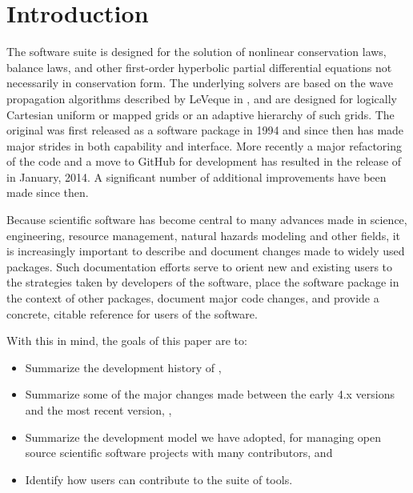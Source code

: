 %
%
%

\section{Introduction}\label{sec:intro}

The \clawpack software suite \cite{clawpack} is designed for the
solution of nonlinear conservation laws, balance laws, and other
first-order hyperbolic partial differential equations not necessarily
in conservation form.  The underlying solvers are based on the wave
propagation algorithms described by LeVeque in \cite{rjl:fvmhp}, and
are designed for logically Cartesian uniform or mapped grids or an
adaptive hierarchy of such grids.  The original \clawpack was first
released as a software package in 1994 and since then has made major
strides in both capability and interface. More recently a major
refactoring of the code and a move to GitHub for development has
resulted in the release of  in January, 2014. A
significant number of additional improvements have been made since
then.

Because scientific software  has become central to many advances made
in science, engineering, resource management, natural hazards modeling
and other fields, it is increasingly important to describe and
document changes made to widely used packages.  Such documentation efforts
serve to orient new and existing users to the  strategies
taken by developers of the software, place the software package in the context
of other packages, document major code changes, and provide a
concrete, citable reference for users of the software.

\newpage %
With this in mind, the goals of this paper are to:

\begin{itemize}
\item Summarize the development history of \clawpack,
\item Summarize some of the major changes made between the early \clawpack
4.x versions and the most recent version, ,
\item Summarize the development model we have adopted, for
managing open source scientific software
projects with many contributors, and
\item Identify how users can contribute to the \clawpack suite of tools.
\end{itemize}


